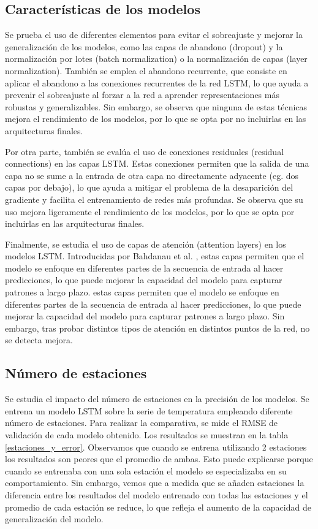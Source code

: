 \subsection{Características de los modelos}
Se prueba el uso de diferentes elementos para evitar el sobreajuste y mejorar la generalización de los modelos, como las capas de abandono (dropout) y la normalización 
por lotes (batch normalization) o la normalización de capas (layer normalization). También se emplea el abandono recurrente, que consiste en aplicar el abandono a las conexiones recurrentes de la red LSTM, lo que ayuda a prevenir el sobreajuste al forzar a la red a aprender representaciones más robustas y generalizables.
Sin embargo, se observa que ninguna de estas técnicas mejora el rendimiento de los modelos, por lo que se opta por no incluirlas en las arquitecturas finales.

Por otra parte, también se evalúa el uso de conexiones residuales (residual connections) en las capas LSTM. Estas conexiones permiten que la salida de una capa no se sume a la
 entrada de otra capa no directamente adyacente (eg. dos capas por debajo), lo que ayuda a mitigar el problema de la desaparición del gradiente y facilita el entrenamiento de redes más profundas.
Se observa que su uso mejora ligeramente el rendimiento de los modelos, por lo que se opta por incluirlas en las arquitecturas finales.

Finalmente, se estudia el uso de capas de atención (attention layers) en los modelos LSTM. Introducidas por Bahdanau et al. \cite{bahdanau2014}, estas capas permiten que el modelo se enfoque en diferentes partes de la secuencia de entrada al hacer predicciones, lo que puede mejorar la capacidad del modelo para capturar patrones a largo plazo.
estas capas permiten que el modelo se enfoque en diferentes partes de la secuencia de entrada al hacer predicciones, lo que puede mejorar la capacidad del modelo para capturar patrones a largo plazo. Sin embargo, tras probar distintos tipos de atención en distintos puntos de la red, no se detecta mejora.

\subsection{Número de estaciones}
Se estudia el impacto del número de estaciones en la precisión de los modelos. Se entrena un modelo LSTM sobre la serie de temperatura empleando diferente número de estaciones.
Para realizar la comparativa, se mide el RMSE de validación de cada modelo obtenido. Los resultados se muestran en la tabla \ref{estaciones_y_error}. Observamos que cuando se entrena utilizando 2 estaciones los resultados son peores que el promedio de ambas.
Esto puede explicarse porque cuando se entrenaba con una sola estación el modelo se especializaba en su comportamiento. Sin embargo, vemos que a medida que se añaden estaciones la 
diferencia entre los resultados del modelo entrenado con todas las estaciones y el promedio de cada estación se reduce, lo que refleja el aumento de la capacidad de generalización del modelo.

